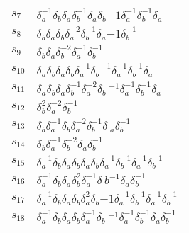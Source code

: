 \documentclass{article}
\begin{document}
\begin{center}
\begin{tabular}{ll}
$s_{7}$ & $\delta_a^{-1}\delta_b^{}\delta_a^{}\delta_b^{-1}\delta_a^{}\delta_b^\
{-1}\delta_a^{-1}\delta_b^{-1}\delta_a^{}$ \\
$s_{8}$ & $\delta_b^{}\delta_a^{}\delta_b^{}\delta_a^{-2}\delta_b^{-1}\delta_a^\
{-1}\delta_b^{-1}$ \\
$s_{9}$ & $\delta_b^{}\delta_a^{}\delta_b^{-2}\delta_a^{-1}\delta_b^{-1}$ \\
$s_{10}$ & $\delta_a^{}\delta_b^{}\delta_a^{}\delta_b^{}\delta_a^{-1}\delta_b^{\
-1}\delta_a^{-1}\delta_b^{-1}\delta_a^{}$ \\
$s_{11}$ & $\delta_a^{}\delta_b^{}\delta_a^{}\delta_b^{-1}\delta_a^{-2}\delta_b\
^{-1}\delta_a^{-1}\delta_b^{-1}\delta_a^{}$ \\
$s_{12}$ & $\delta_b^{2}\delta_a^{-2}\delta_b^{-1}$ \\
$s_{13}$ & $\delta_b^{}\delta_a^{-1}\delta_b^{}\delta_a^{-2}\delta_b^{-1}\delta\
_a^{}\delta_b^{-1}$ \\
$s_{14}$ & $\delta_b^{}\delta_a^{-1}\delta_b^{-2}\delta_a^{}\delta_b^{-1}$ \\
$s_{15}$ & $\delta_a^{-1}\delta_b^{}\delta_a^{}\delta_b^{}\delta_a^{}\delta_b^{\
}\delta_a^{-1}\delta_b^{-1}\delta_a^{-1}\delta_b^{-1}$ \\
$s_{16}$ & $\delta_a^{-1}\delta_b^{}\delta_a^{}\delta_b^{2}\delta_a^{-1}\delta_\
b^{-1}\delta_a^{}\delta_b^{-1}$ \\
$s_{17}$ & $\delta_a^{-1}\delta_b^{}\delta_a^{}\delta_b^{}\delta_a^{2}\delta_b^\
{-1}\delta_a^{-1}\delta_b^{-1}\delta_a^{-1}\delta_b^{-1}$ \\
$s_{18}$ & $\delta_a^{-1}\delta_b^{}\delta_a^{}\delta_b^{}\delta_a^{-1}\delta_b\
^{-1}\delta_a^{-1}\delta_b^{-1}\delta_a^{}\delta_b^{-1}$ \\
\bottomrule
\end{tabular}
\end{center}

\thispagestyle{empty}
\end{document}
